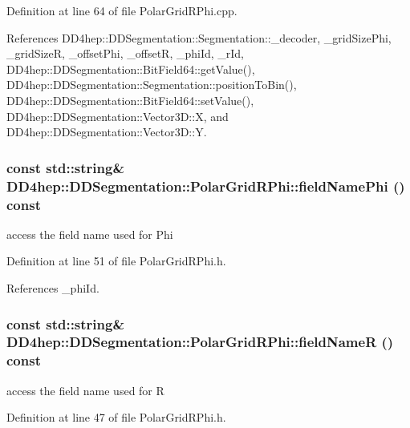 Definition at line 64 of file PolarGridRPhi.cpp.

References DD4hep::DDSegmentation::Segmentation::\_\-decoder, \_\-gridSizePhi, \_\-gridSizeR, \_\-offsetPhi, \_\-offsetR, \_\-phiId, \_\-rId, DD4hep::DDSegmentation::BitField64::getValue(), DD4hep::DDSegmentation::Segmentation::positionToBin(), DD4hep::DDSegmentation::BitField64::setValue(), DD4hep::DDSegmentation::Vector3D::X, and DD4hep::DDSegmentation::Vector3D::Y.\hypertarget{class_d_d4hep_1_1_d_d_segmentation_1_1_polar_grid_r_phi_a150842292be492a82d3fb074535d770c}{
\subsubsection[{fieldNamePhi}]{\setlength{\rightskip}{0pt plus 5cm}const std::string\& DD4hep::DDSegmentation::PolarGridRPhi::fieldNamePhi () const}}
\label{class_d_d4hep_1_1_d_d_segmentation_1_1_polar_grid_r_phi_a150842292be492a82d3fb074535d770c}


access the field name used for Phi 

Definition at line 51 of file PolarGridRPhi.h.

References \_\-phiId.\hypertarget{class_d_d4hep_1_1_d_d_segmentation_1_1_polar_grid_r_phi_a5a08a8eec2ad2bbccb3b42b4bddea411}{
\subsubsection[{fieldNameR}]{\setlength{\rightskip}{0pt plus 5cm}const std::string\& DD4hep::DDSegmentation::PolarGridRPhi::fieldNameR () const}}
\label{class_d_d4hep_1_1_d_d_segmentation_1_1_polar_grid_r_phi_a5a08a8eec2ad2bbccb3b42b4bddea411}


access the field name used for R 

Definition at line 47 of file PolarGridRPhi.h.

